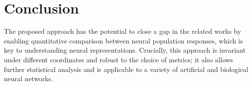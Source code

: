 \documentclass[9pt,conference]{IEEEtran}
\begin{document}

\section{Conclusion}
The proposed approach has the potential to close a gap in the related works by enabling quantitative comparison between neural population responses, which is key to understanding neural representations. Crucially, this approach is invariant under different coordinates and robust to the choice of metrics; it also allows further statistical analysis and is applicable to a variety of artificial and biological neural networks.






\end{document}
